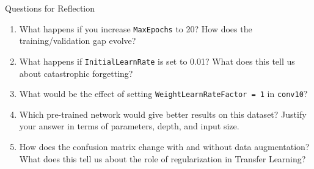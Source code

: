 \documentclass[aspectratio=169,xcolor=dvipsnames]{beamer}
\begin{document}
\begin{frame}{Questions for Reflection}
    \begin{enumerate}
        \item What happens if you increase \texttt{MaxEpochs} to 20? How does the training/validation gap evolve?

        \vspace{0.3cm}
        \item What happens if \texttt{InitialLearnRate} is set to 0.01? What does this tell us about catastrophic forgetting?

        \vspace{0.3cm}
        \item What would be the effect of setting \texttt{WeightLearnRateFactor = 1} in \texttt{conv10}?

        \vspace{0.3cm}
        \item Which pre-trained network would give better results on this dataset? Justify your answer in terms of parameters, depth, and input size.

        \vspace{0.3cm}
        \item How does the confusion matrix change with and without data augmentation? What does this tell us about the role of regularization in Transfer Learning?
    \end{enumerate}
\end{frame}
\end{document}
